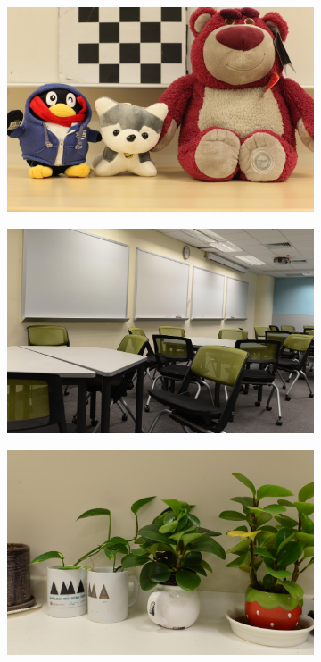 \begin{figure}
\begin{subfigure}[t]{0.32\textwidth}
    \end{subfigure}
    \hfill
    \begin{subfigure}[t]{0.32\textwidth}
        \centering
        \includegraphics[width=1\textwidth]{images/dataset/Canon5D2_5_200_3200_toy_mean.JPG}
    \end{subfigure}
    \hfill
    \begin{subfigure}[t]{0.32\textwidth}
        \centering
        \includegraphics[width=1\textwidth]{images/dataset/NikonD800_4-5_160_1800_classroom_mean.JPG}
    \end{subfigure}
    \hfill
    \begin{subfigure}[t]{0.32\textwidth}
        \centering
        \includegraphics[width=1\textwidth]{images/dataset/NikonD800_6-3_125_5000_plant_mean.JPG}

\end{subfigure}
\end{figure}
